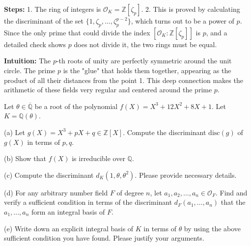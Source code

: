 \begin{solution}
\medskip
\textbf{Steps:}
1. The ring of integers is $\mathcal{O}_K = \mathbb{Z}[\zeta_p]$.
2. This is proved by calculating the discriminant of the set $\{1, \zeta_p, \dots, \zeta_p^{p-2}\}$, which turns out to be a power of $p$. Since the only prime that could divide the index $[\mathcal{O}_K : \mathbb{Z}[\zeta_p]]$ is $p$, and a detailed check shows $p$ does not divide it, the two rings must be equal.

\medskip
\textbf{Intuition:}
The $p$-th roots of unity are perfectly symmetric around the unit circle. The prime $p$ is the "glue" that holds them together, appearing as the product of all their distances from the point 1. This deep connection makes the arithmetic of these fields very regular and centered around the prime $p$.
\end{solution}

\begin{exercise}
\label{algebra:2022:6}
Let $\theta \in \overline{\mathbb{Q}}$ be a root of the polynomial $f(X) = X^3 + 12X^2 + 8X + 1$. Let $K = \mathbb{Q}(\theta)$.

(a) Let $g(X) = X^3 + pX + q \in \mathbb{Z}[X]$. Compute the discriminant $\mathrm{disc}(g)$ of $g(X)$ in terms of $p, q$.

(b) Show that $f(X)$ is irreducible over $\mathbb{Q}$.

(c) Compute the discriminant $d_K(1, \theta, \theta^2)$. Please provide necessary details.

(d) For any arbitrary number field $F$ of degree $n$, let $a_1, a_2, \ldots, a_n \in \mathcal{O}_F$. Find and verify a sufficient condition in terms of the discriminant $d_F(a_1, \ldots, a_n)$ that the $a_1, \ldots, a_n$ form an integral basis of $F$.

(e) Write down an explicit integral basis of $K$ in terms of $\theta$ by using the above sufficient condition you have found. Please justify your arguments.
\end{exercise}

